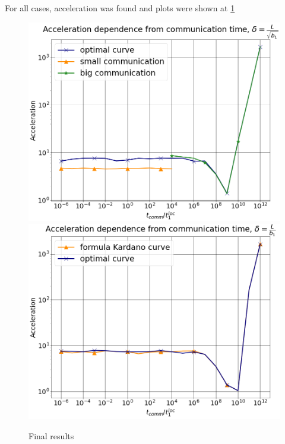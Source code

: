 \documentclass{article}
\begin{document}
For all cases, acceleration was found and plots were shown at \ref{ris:image}

\begin{figure}[!ht]
    {\includegraphics[scale = 0.2]{final_graph1.png}}
    {\includegraphics[scale = 0.2]{final_graph2.png}}
    \caption{Final results}
    \label{ris:image}
\end{figure}


\end{document}

